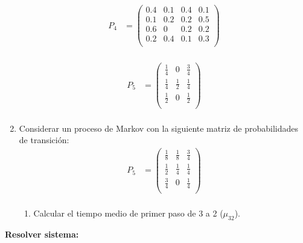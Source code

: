 \documentclass{templateNote}
\begin{document}
\begin{enumerate}
    \begin{align*}
        P_4 &= \left(
            \begin{array}{cccc}    
                0.4&0.1&0.4&0.1\\
                0.1&0.2&0.2&0.5\\
                0.6&0&0.2&0.2\\
                0.2&0.4&0.1&0.3\\
            \end{array}
            \right)\\
    \end{align*}
    
    \begin{align*}
        P_5 &= \left(
            \begin{array}{ccc}    
                \frac{1}{4}   &  0  & \frac{3}{4}  \\
                \frac{1}{4} & \frac{1}{2} & \frac{1}{4}  \\
                \frac{1}{2} & 0 & \frac{1}{2}\\
            \end{array}
            \right)\\
    \end{align*}


    \newpage
    \item Considerar un proceso de Markov con la siguiente matriz de probabilidades de transición:
    \begin{align*}
    P_5 &= \left(
        \begin{array}{ccc}    
            \frac{1}{8}   &  \frac{1}{8}    & \frac{3}{4}  \\
            \frac{1}{2}   &  \frac{1}{4}    & \frac{1}{4}  \\
            \frac{3}{4}   &       0         & \frac{1}{4}\\
        \end{array}
        \right)\\
    \end{align*}

    \begin{enumerate}[label=\alph*)]
        \item Calcular el tiempo medio de primer paso de 3 a 2 ($\mu_{32}$).
    \end{enumerate}

\end{enumerate}

\textbf{Resolver sistema:} 
\end{document}
